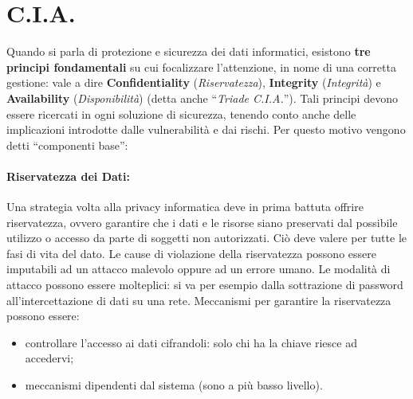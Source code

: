 \section{C.I.A.}

Quando si parla di protezione e sicurezza dei dati informatici,
esistono \textbf{tre principi fondamentali} su cui focalizzare l'attenzione,
in nome di una corretta gestione: vale a
dire \textbf{Confidentiality} (\textit{Riservatezza}),
\textbf{Integrity} (\textit{Integrità}) e
\textbf{Availability} (\textit{Disponibilità})
(detta anche ``\textit{Triade C.I.A.}'').
Tali principi devono essere ricercati in ogni soluzione di sicurezza, tenendo
conto anche delle implicazioni introdotte dalle vulnerabilità e dai rischi.
Per questo motivo vengono detti ``componenti base'':

\paragraph{Riservatezza dei Dati:}

Una strategia volta alla privacy informatica deve in prima battuta offrire
riservatezza, ovvero garantire che i dati e le risorse siano preservati dal
possibile utilizzo o accesso da parte di soggetti non autorizzati.
Ciò deve valere per tutte le fasi di vita del dato.
Le cause di violazione della riservatezza possono essere imputabili ad un attacco
malevolo oppure ad un errore umano. Le modalità di attacco possono essere molteplici:
si va per esempio dalla sottrazione di password all’intercettazione di dati su
una rete. Meccanismi per garantire la riservatezza possono essere:

\begin{itemize}
    \item controllare l'accesso ai dati cifrandoli:
          solo chi ha la chiave riesce ad accedervi;
    \item meccanismi dipendenti dal sistema (sono a più basso livello).
\end{itemize}

